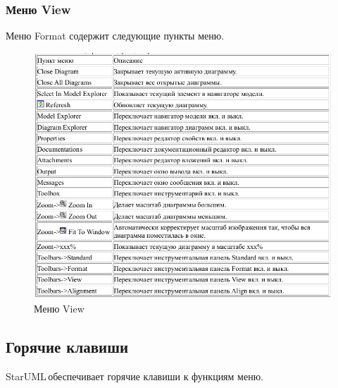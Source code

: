 \documentclass[a4paper,12pt]{report}
\newcommand{\staruml}{StarUML\,\tm}
\begin{document}
\subsubsection*{Меню View}
Меню Format содержит следующие пункты меню.
\begin{figure}[h!]
	\centering
	\includegraphics[width=\linewidth]{images/viewmenu}
	\caption{Меню View}
	\label{fig:viewmenu}
\end{figure}


\subsection*{Горячие клавиши}
\staruml обеспечивает горячие клавиши к функциям меню.
\end{document}
